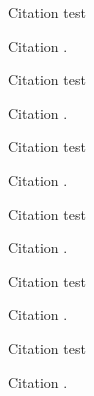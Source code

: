 \documentclass[UTF8,scheme=plain,fontset=fandol]{ctexart}
\begin{document}
\START
\showoutput

Citation \citet[42]{jon89} test\par
Citation \citet[42]{jon89}.\par
Citation \citep[42]{jon89} test\par
Citation \citep[42]{jon89}.\par

Citation \citet[42]{jon89} test\par
Citation \citet[42]{jon89}.\par
Citation \citep[42]{jon89} test\par
Citation \citep[42]{jon89}.\par

Citation \citet[42]{jon89} test\par
Citation \citet[42]{jon89}.\par
Citation \citep[42]{jon89} test\par
Citation \citep[42]{jon89}.\par

\clearpage
\OMIT


\end{document}
